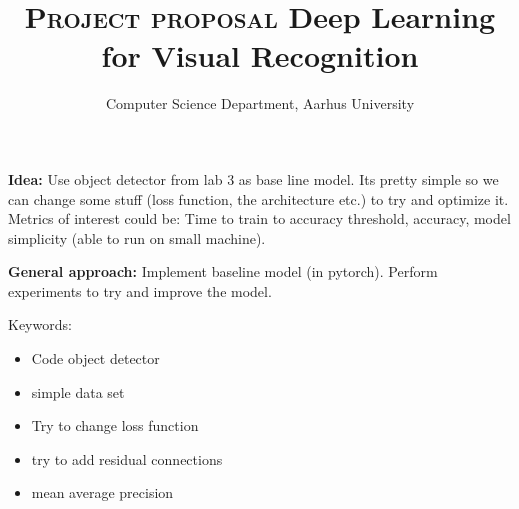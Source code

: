 \documentclass[12pt]{article}
\title{
    \vspace{5cm}
    \Large{\textsc{Project proposal}}
    \linebreak
    \Large{Deep Learning for Visual Recognition}
}
\author{Computer Science Department, Aarhus University}
\begin{document}

\textbf{Idea:} Use object detector from lab 3 as base line model. Its pretty simple so we can change some stuff (loss function, the architecture etc.) to try and optimize it. Metrics of interest could be: Time to train to accuracy threshold, accuracy, model simplicity (able to run on small machine).

\textbf{General approach:} Implement baseline model (in pytorch). Perform experiments to try and improve the model. 

Keywords:
\begin{itemize}
	\item Code object detector 
	\item simple data set
	\item Try to change loss function
	\item try to add residual connections
	\item mean average precision
\end{itemize}

% 
% 
\end{document}

